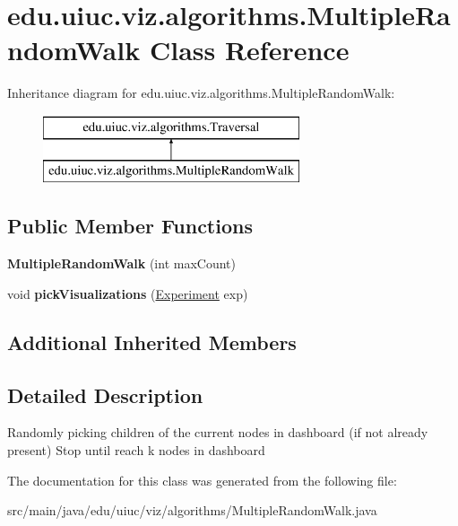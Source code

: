 \hypertarget{classedu_1_1uiuc_1_1viz_1_1algorithms_1_1_multiple_random_walk}{}\section{edu.\+uiuc.\+viz.\+algorithms.\+Multiple\+Random\+Walk Class Reference}
\label{classedu_1_1uiuc_1_1viz_1_1algorithms_1_1_multiple_random_walk}
Inheritance diagram for edu.\+uiuc.\+viz.\+algorithms.\+Multiple\+Random\+Walk\+:\begin{figure}[H]
\begin{center}
\leavevmode
\includegraphics[height=2.000000cm]{classedu_1_1uiuc_1_1viz_1_1algorithms_1_1_multiple_random_walk}
\end{center}
\end{figure}
\subsection*{Public Member Functions}
\begin{DoxyCompactItemize}
\item 
\mbox{\label{classedu_1_1uiuc_1_1viz_1_1algorithms_1_1_multiple_random_walk_aa80e6635e344e584b3aac1254edb7528}} 
{\bfseries Multiple\+Random\+Walk} (int max\+Count)
\item 
\mbox{\label{classedu_1_1uiuc_1_1viz_1_1algorithms_1_1_multiple_random_walk_ab2b80b371ebe80d68c2908cfd62b05f9}} 
void {\bfseries pick\+Visualizations} (\mbox{\hyperlink{classedu_1_1uiuc_1_1viz_1_1algorithms_1_1_experiment}{Experiment}} exp)
\end{DoxyCompactItemize}
\subsection*{Additional Inherited Members}


\subsection{Detailed Description}
Randomly picking children of the current nodes in dashboard (if not already present) Stop until reach k nodes in dashboard 

The documentation for this class was generated from the following file\+:\begin{DoxyCompactItemize}
\item 
src/main/java/edu/uiuc/viz/algorithms/Multiple\+Random\+Walk.\+java\end{DoxyCompactItemize}
